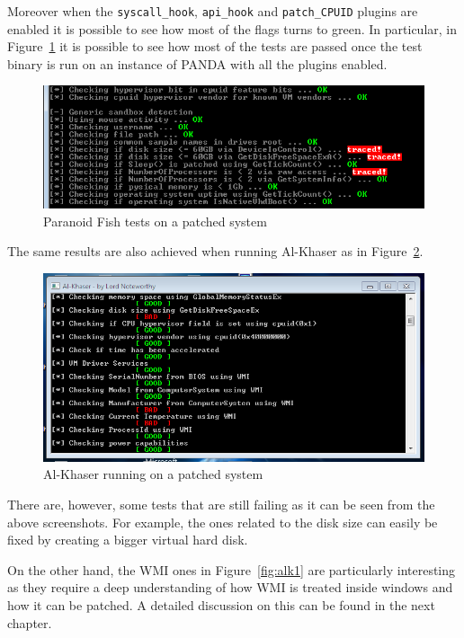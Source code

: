 Moreover when the \lstinline{syscall_hook}, \lstinline{api_hook} and \lstinline{patch_CPUID} plugins are enabled it is possible to see how most of the flags turns to green. In particular, in Figure~\ref{fig:res1} it is possible to see how most of the tests are passed once the test binary is run on an instance of PANDA with all the plugins enabled.

\begin{figure}[h!]
    \centering
    \includegraphics[width=\linewidth]{images/par2.png}%
    \caption{Paranoid Fish tests on a patched system}%
    \label{fig:res1}%
\end{figure}

The same results are also achieved when running Al-Khaser as in Figure~\ref{fig:alk2}.

\begin{figure}[h!]
    \centering
    \includegraphics[width=\linewidth]{images/al2.png}%
    \caption{Al-Khaser running on a patched system}%
    \label{fig:alk2}%
\end{figure}

There are, however, some tests that are still failing as it can be seen from the above screenshots. For example, the ones related to the disk size can easily be fixed by creating a bigger virtual hard disk.

On the other hand, the WMI ones in Figure~\ref{fig:alk1} are particularly interesting as they require a deep understanding of how WMI is treated inside windows and how it can be patched. A detailed discussion on this can be found in the next chapter. 

